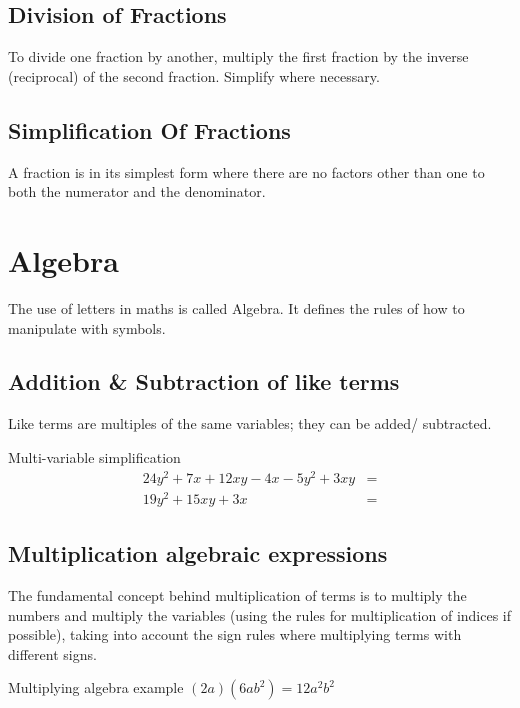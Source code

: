 \subsection*{Division of Fractions}
To divide one fraction by another, multiply the first fraction by the inverse (reciprocal) of the second fraction. Simplify where necessary.
\subsection*{Simplification Of Fractions}
A fraction is in its simplest form where there are no factors other than one to both the numerator and the denominator. 

\section*{Algebra}
The use of letters in maths is called Algebra. It defines the rules of how to manipulate with symbols.

\subsection*{Addition \& Subtraction of like terms}

Like terms are multiples of the same variables; they can be added/ subtracted.
\begin{example}{Multi-variable simplification}
\begin{align*}
24y^2 + 7x + 12xy - 4x - 5y^2 + 3xy &=\\
19y^2 + 15xy + 3x &=
\end{align*}
\end{example}

\subsection*{Multiplication algebraic expressions}
The fundamental concept behind multiplication of terms is to multiply the numbers and multiply the variables (using the rules for multiplication of indices if possible), taking into account the sign rules where multiplying terms with different signs. 
\begin{example}{Multiplying algebra example}
    $\displaystyle (2a)(6ab^2) = 12a^2b^2$
\end{example}


